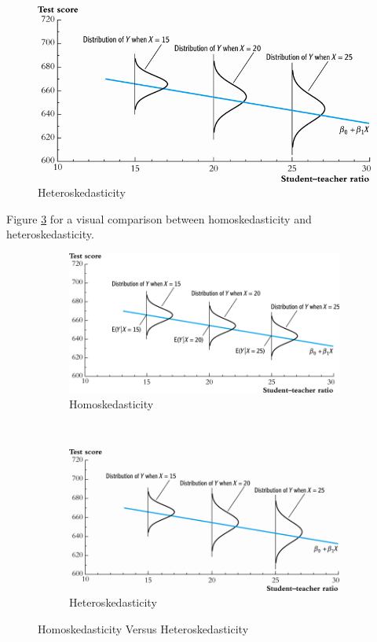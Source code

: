\documentclass[presentation]{beamer}
\begin{document}
\begin{figure}[htbp]
\centering
\includegraphics[width=.9\linewidth]{figure/fig-5-2.png}
\caption{Heteroskedasticity}
\end{figure}

Figure \ref{fig:homovshetero} for a visual comparison between
homoskedasticity and heteroskedasticity.

\begin{figure}
    \centering
    \begin{subfigure}[!ht]{0.85\textwidth}
        \includegraphics[width=\textwidth]{./figure/fig-4-4}
        \caption{Homoskedasticity}
        \label{fig:homo1}
    \end{subfigure}
    ~ %
    \begin{subfigure}[!ht]{0.85\textwidth}
        \includegraphics[width=\textwidth]{./figure/fig-5-2}
        \caption{Heteroskedasticity}
        \label{fig:hetero1}
    \end{subfigure}
    \caption{Homoskedasticity Versus Heteroskedasticity}\label{fig:homovshetero}
\end{figure}
\end{document}
